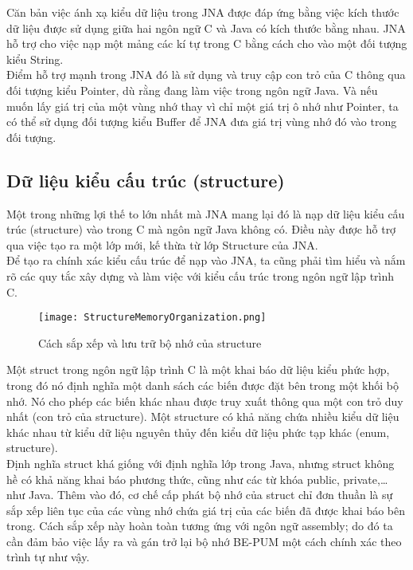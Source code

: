 Căn bản việc ánh xạ kiểu dữ liệu trong JNA được đáp ứng bằng việc kích thước dữ liệu được sử dụng giữa hai ngôn ngữ C và Java có kích thước bằng nhau. JNA hỗ trợ cho việc nạp một mảng các kí tự trong C bằng cách cho vào một đối tượng kiểu String.\\
 
Điểm hỗ trợ mạnh trong JNA đó là sử dụng và truy cập con trỏ của C thông qua đối tượng kiểu Pointer, dù rằng đang làm việc trong ngôn ngữ Java. Và nếu muốn lấy giá trị của một vùng nhớ thay vì chỉ một giá trị ô nhớ như Pointer, ta có thể sử dụng đối tượng kiểu Buffer để JNA đưa giá trị vùng nhớ đó vào trong đối tượng.


	\subsection{Dữ liệu kiểu cấu trúc (structure)} \label{sec:structure}

Một trong những lợi thế to lớn nhất mà JNA mang lại đó là nạp dữ liệu kiểu cấu trúc (structure) vào trong C mà ngôn ngữ Java không có. Điều này được hỗ trợ qua việc tạo ra một lớp mới, kế thừa từ lớp Structure của JNA.\\

Để tạo ra chính xác kiểu cấu trúc để nạp vào JNA, ta cũng phải tìm hiểu và nắm rõ các quy tắc xây dựng và làm việc với kiểu cấu trúc trong ngôn ngữ lập trình C.

		\begin{center}
			\begin{figure}[h]
				\texttt{[image: StructureMemoryOrganization.png]}
				\caption{Cách sắp xếp và lưu trữ bộ nhớ của structure}				
			\end{figure}
		\end{center}

Một struct trong ngôn ngữ lập trình C là một khai báo dữ liệu kiểu phức hợp, trong đó nó định nghĩa một danh sách các biến được đặt bên trong một khối bộ nhớ. Nó cho phép các biến khác nhau được truy xuất thông qua một con trỏ duy nhất (con trỏ của structure). Một structure có khả năng chứa nhiều kiểu dữ liệu khác nhau từ kiểu dữ liệu nguyên thủy đến kiểu dữ liệu phức tạp khác (enum, structure).\\

Định nghĩa struct khá giống với định nghĩa lớp trong Java, nhưng struct không hề có khả năng khai báo phương thức, cũng như các từ khóa public, private,… như Java. Thêm vào đó, cơ chế cấp phát bộ nhớ của struct chỉ đơn thuần là sự sắp xếp liên tục của các vùng nhớ chứa giá trị của các biến đã được khai báo bên trong. Cách sắp xếp này hoàn toàn tương ứng với ngôn ngữ assembly; do đó ta cần đảm bảo việc lấy ra và gán trở lại bộ nhớ BE-PUM một cách chính xác theo trình tự như vậy.

